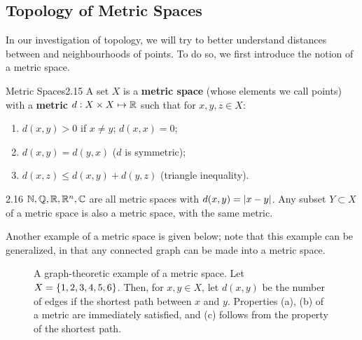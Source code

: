 \subsection{Topology of Metric Spaces}
In our investigation of topology, we will try to better understand distances between and neighbourhoods of points. To do so, we first introduce the notion of a metric space.
\begin{definition}{Metric Spaces}{2.15}
    A set $X$ is a \textbf{metric space} (whose elements we call points) with a \textbf{metric} $d: X \times X \mapsto \mathbb{R}$ such that for $x, y, z \in X$:
    \begin{enumerate}
        \item $d(x, y) > 0$ if $x \neq y$; $d(x, x) = 0$;
        \item $d(x, y) = d(y, x)$ ($d$ is symmetric);
        \item $d(x, z) \leq d(x, y) + d(y, z)$ (triangle inequality).
    \end{enumerate}
\end{definition}
\begin{example}{}{2.16}
    $\mathbb{N}, \mathbb{Q}, \mathbb{R}, \mathbb{R}^n, \mathbb{C}$ are all metric spaces with $d(x, y) = \abs{x - y}$. Any subset $Y \subset X$ of a metric space is also a metric space, with the same metric. 
\end{example}
\noindent Another example of a metric space is given below; note that this example can be generalized, in that any connected graph can be made into a metric space. 
\begin{figure}[htbp]
    \centering
    
    \caption{A graph-theoretic example of a metric space. Let $X = \set{1, 2, 3, 4, 5, 6}$. Then, for $x, y \in X$, let $d(x, y)$ be the number of edges if the shortest path between $x$ and $y$. Properties (a), (b) of a metric are immediately satisfied, and (c) follows from the property of the shortest path.}
    \label{fig5}
\end{figure}

